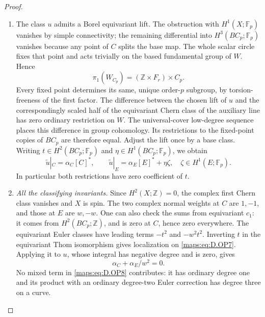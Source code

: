 \begin{proof}
\begin{enumerate}[label=\arabic*.,leftmargin=*]
\item The class $u$ admits a Borel equivariant lift. The obstruction
with $H^1(X;\mathbb F_p)$ vanishes by simple connectivity;
the remaining differential into $H^3(BC_p;\mathbb F_p)$
vanishes because any point of $C$ splits the base map.
The whole scalar circle fixes that point and acts trivially
on the based fundamental group of $W$. Hence
\[
 \pi_1(W_{C_p})=(\mathbb Z\times F_r)\times C_p.
\]
Every fixed point determines its same, unique order-$p$
subgroup, by torsion-freeness of the first factor.
The difference between the chosen lift of $u$ and the correspondingly scaled half of
the equivariant Chern class of the auxiliary line has zero
ordinary restriction on $W$. The universal-cover low-degree
sequence places this difference in group cohomology.
Its restrictions to the fixed-point copies of $BC_p$ are
therefore equal. Adjust the lift once by a base class.
Writing $t\in H^2(BC_p;\mathbb F_p)$ and
$\eta\in H^1(BC_p;\mathbb F_p)$, we obtain
\[
 \widetilde u|_C=\alpha_C[C]^*,\qquad
 \widetilde u|_E=\alpha_E[E]^*+\eta\zeta,
                  \quad\zeta\in H^1(E;\mathbb F_p).
 \tag{D.OP8}\label{maps:eq:D.OP8}
\]
In particular both restrictions have zero coefficient of $t$.

\item \emph{All the classifying invariants.}
Since $H^2(X;\mathbb Z)=0$, the complex first Chern class
vanishes and $X$ is spin. The two complex normal weights
at $C$ are $1,-1$, and those at $E$ are $w,-w$.
One can also check the sums from equivariant $c_1$:
it comes from $H^2(BC_p;\mathbb Z)$, and is zero at $C$,
hence zero everywhere. The equivariant Euler classes
have leading terms $-t^2$ and $-w^2t^2$.
Inverting $t$ in the equivariant Thom isomorphism gives
localization on \eqref{maps:eq:D.OP7}. Applying it to $u$, whose integral
has negative degree and is zero, gives
\[
                      \alpha_C+\alpha_E/w^2=0.
 \tag{D.OP9}\label{maps:eq:D.OP9}
\]
No mixed term in \eqref{maps:eq:D.OP8} contributes: it has ordinary
degree one and its product with an ordinary degree-two
Euler correction has degree three on a curve.


\end{enumerate}
\end{proof}
